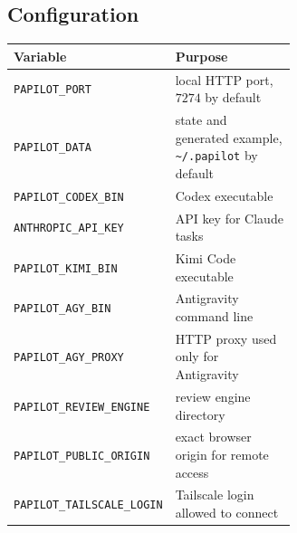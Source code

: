 \subsection{Configuration}

\begin{center}
\small
\begin{tabular}{@{}lp{0.62\linewidth}@{}}
\toprule
Variable & Purpose \\
\midrule
\texttt{PAPILOT\_PORT} & local HTTP port, $7274$ by default \\
\texttt{PAPILOT\_DATA} & state and generated example, \texttt{\textasciitilde/.papilot} by default \\
\texttt{PAPILOT\_CODEX\_BIN} & Codex executable \\
\texttt{ANTHROPIC\_API\_KEY} & API key for Claude tasks \\
\texttt{PAPILOT\_KIMI\_BIN} & Kimi Code executable \\
\texttt{PAPILOT\_AGY\_BIN} & Antigravity command line \\
\texttt{PAPILOT\_AGY\_PROXY} & HTTP proxy used only for Antigravity \\
\texttt{PAPILOT\_REVIEW\_ENGINE} & review engine directory \\
\texttt{PAPILOT\_PUBLIC\_ORIGIN} & exact browser origin for remote access \\
\texttt{PAPILOT\_TAILSCALE\_LOGIN} & Tailscale login allowed to connect \\
\bottomrule
\end{tabular}
\end{center}
